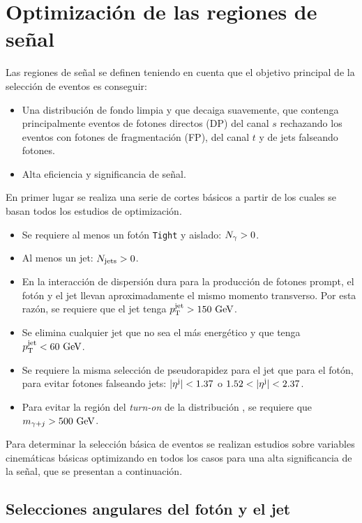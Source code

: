 \section{Optimización de las regiones de señal}
\label{sec:evt_selection:sr_opt}

Las regiones de señal se definen teniendo en cuenta que el objetivo principal de la selección de eventos es conseguir:
\begin{itemize}
    \item Una distribución de fondo limpia y que decaiga suavemente, que contenga principalmente eventos \gammajet de fotones directos (\acs{DP}) del canal \(s\) rechazando los eventos con fotones de fragmentación (\acs{FP}), del canal \(t\) y de jets falseando fotones.
    \item Alta eficiencia y significancia de señal.
\end{itemize}


En primer lugar se realiza una serie de cortes básicos a partir de los cuales se basan todos los estudios de optimización.
\begin{itemize}
    \item Se requiere al menos un fotón \texttt{Tight} y aislado: \(N_{\gamma} > 0\).
    \item Al menos un jet: \(N_{\text{jets}} > 0\).
    \item En la interacción de dispersión dura para la producción de fotones prompt, el fotón y el jet llevan aproximadamente el mismo momento transverso. Por esta razón, se requiere que el jet tenga \(p_{\text{T}}^\text{jet} > 150~\text{GeV}\).
    \item Se elimina cualquier jet que no sea el más energético y que tenga \(p_{\text{T}}^\text{jet} < 60~\text{GeV}\).
    \item Se requiere la misma selección de pseudorapidez para el jet que para el fotón, para evitar fotones falseando jets: \(|\eta^{\text{j}}| < 1.37\) o \(1.52 < |\eta^{\text{j}}| < 2.37\).
    \item Para evitar la región del \textit{turn-on} de la distribución \myj, se requiere que \(m_{\gamma+j} > 500~\text{GeV}\).
\end{itemize}
Para determinar la selección básica de eventos se realizan estudios sobre variables cinemáticas básicas optimizando en todos los casos para una alta significancia de la señal, que se presentan a continuación.


\subsection{Selecciones angulares del fotón y el jet}
\label{subsec:evt_selection:sr_opt:eta}



